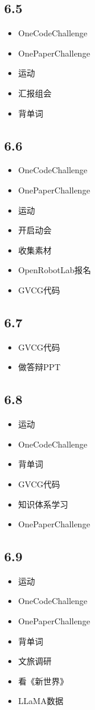 \documentclass[UTF8]{ctexart}
\begin{document}
\subsection*{6.5}
\begin{itemize}
    \item OneCodeChallenge
    \item OnePaperChallenge
    \item 运动
    \item 汇报组会
    \item 背单词
\end{itemize}

\subsection*{6.6}
\begin{itemize}
    \item OneCodeChallenge
    \item OnePaperChallenge
    \item 运动
    \item 开启动会
    \item 收集素材
    \item OpenRobotLab报名
    \item GVCG代码
\end{itemize}

\subsection*{6.7}
\begin{itemize}
    \item GVCG代码
    \item 做答辩PPT
\end{itemize}

\subsection*{6.8}
\begin{itemize}
    \item 运动
    \item OneCodeChallenge
    \item 背单词
    \item GVCG代码
    \item 知识体系学习
    \item OnePaperChallenge
\end{itemize}

\subsection*{6.9}
\begin{itemize}
    \item 运动
    \item OneCodeChallenge
    \item OnePaperChallenge
    \item 背单词
    \item 文旅调研
    \item 看《新世界》
    \item LLaMA数据
\end{itemize}
\end{document}
